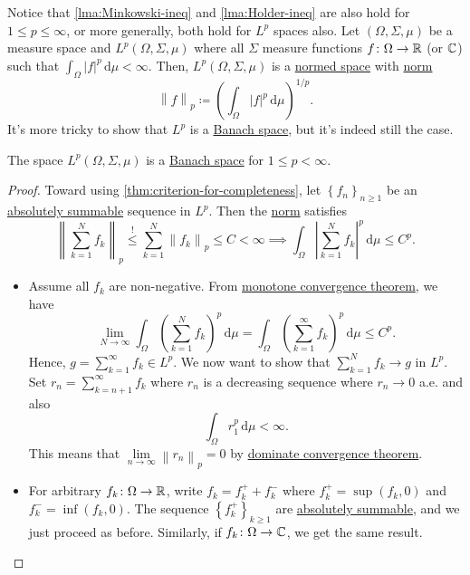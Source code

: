 Notice that \autoref{lma:Minkowski-ineq} and \autoref{lma:Holder-ineq} are also hold for \(1 \leq p \leq \infty \), or more generally, both hold for \(L^p\) spaces also. Let \((\Omega , \Sigma , \mu )\) be a measure space and \(L^p(\Omega , \Sigma , \mu )\) where all \(\Sigma \) measure functions \(f\colon \Omega \to \mathbb{\MakeUppercase{r}} \) (or \(\mathbb{\MakeUppercase{c}} \)) such that \(\int _\Omega \left\vert f \right\vert ^p \,\mathrm{d} \mu < \infty \). Then, \(L^p(\Omega , \Sigma , \mu )\) is a \hyperref[def:normed-vector-space]{normed space} with \hyperref[def:norm]{norm}
\[
	\left\lVert f\right\rVert _p \coloneqq \left( \int _\Omega \left\vert f \right\vert ^p \,\mathrm{d} \mu  \right) ^{1 / p}.
\]
It's more tricky to show that \(L^p\) is a \hyperref[def:Banach-space]{Banach space}, but it's indeed still the case.

\begin{theorem}
	The space \(L^p(\Omega , \Sigma , \mu )\) is a \hyperref[def:Banach-space]{Banach space} for \(1 \leq p < \infty \).
\end{theorem}
\begin{proof}
	Toward using \autoref{thm:criterion-for-completeness}, let \(\left\{ f_n \right\}_{n\geq 1} \) be an \hyperref[def:absolutely-summable]{absolutely summable} sequence in \(L^p\). Then the \hyperref[def:norm]{norm} satisfies
	\[
		\left\lVert \sum_{k=1}^{N} f_k\right\rVert _p \overset{\hyperref[lma:Minkowski-ineq]{\text{!}}}{\leq} \sum_{k=1}^{N} \left\lVert f_k\right\rVert _p \leq C < \infty \implies \int _\Omega \left\vert \sum_{k=1}^{N} f_k \right\vert^p \,\mathrm{d} \mu  \leq C^p.
	\]
	\begin{itemize}
		\item Assume all \(f_k\) are non-negative. From \href{https://en.wikipedia.org/wiki/Monotone_convergence_theorem}{monotone convergence theorem}, we have
		      \[
			      \lim\limits_{N \to \infty} \int _\Omega \left( \sum_{k=1}^{N} f_k \right) ^p \,\mathrm{d} \mu = \int _\Omega \left( \sum_{k=1}^{\infty} f_k \right)^p \,\mathrm{d} \mu \leq C^p.
		      \]
		      Hence, \(g = \sum_{k=1}^{\infty} f_k\in L^p\). We now want to show that \(\sum_{k=1}^{N} f_k \to g\) in \(L^p\). Set \(r_n = \sum_{k=n+1}^{\infty} f_k\) where \(r_n\) is a decreasing sequence where \(r_n \to 0\) a.e. and also
		      \[
			      \int _\Omega r_1^p\,\mathrm{d} \mu < \infty.
		      \]
		      This means that \(\lim\limits_{n \to \infty} \left\lVert r_n\right\rVert _p = 0\) by \href{https://en.wikipedia.org/wiki/Dominated_convergence_theorem}{dominate convergence theorem}.
		\item For arbitrary \(f_k\colon \Omega \to \mathbb{\MakeUppercase{r}} \), write \(f_k = f^+_k + f^-_k\) where \(f^+_k = \sup (f_k, 0)\) and \(f_k^- = \inf (f_k, 0)\). The sequence \(\left\{ f_k^+ \right\}_{k\geq 1} \) are \hyperref[def:absolutely-summable]{absolutely summable}, and we just proceed as before. Similarly, if \(f_k\colon \Omega \to \mathbb{\MakeUppercase{c}} \), we get the same result.
	\end{itemize}
\end{proof}

